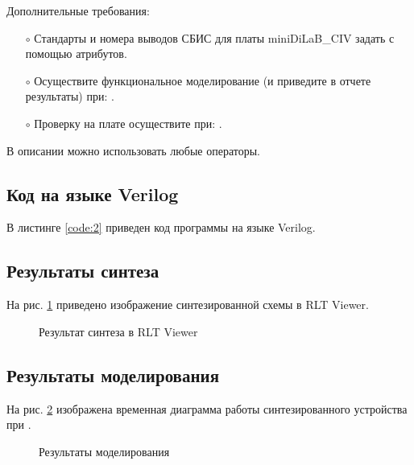 Дополнительные требования:
\begin{itemize}
	\item[$\circ$] Стандарты и номера выводов СБИС для платы miniDiLaB\_CIV задать с помощью атрибутов.
	\item[$\circ$] Осуществите функциональное моделирование (и приведите в отчете результаты) при: .
	\item[$\circ$] Проверку на плате осуществите при: .
\end{itemize}
В описании можно использовать любые операторы.

\newpage

\subsection{Код на языке Verilog}

В листинге \ref{code:2} приведен код программы на языке Verilog.

%
\vspace{-0.5cm}

\subsection{Результаты синтеза}

На рис. \ref{fig:lab6_2_rtl} приведено изображение синтезированной схемы в RLT Viewer.

\begin{figure}[H]
\begin{center}
	\caption{Результат синтеза в RLT Viewer}
	\label{fig:lab6_2_rtl}
\end{center}
\end{figure}

\subsection{Результаты моделирования}
\label{sec:lab6_2_modeling}

На рис. \ref{fig:lab6_2_modeling} изображена временная диаграмма работы синтезированного устройства при .

\begin{figure}[H]
\begin{center}
	\caption{Результаты моделирования}
	\label{fig:lab6_2_modeling}
\end{center}
\end{figure}

